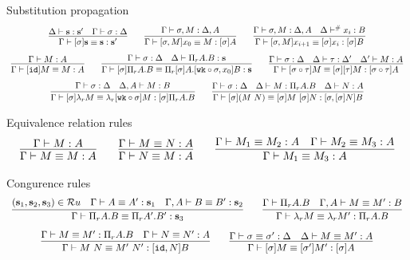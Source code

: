\noindent
Substitution propagation
\[
\begin{array}{c}
\infer{
    \eqexp \Gamma {\tmclo \sigma {\tmcst s}} {\tmcst s} {\tmcst s'}
  }{
    \wfexp \Delta {\tmcst s} {\tmcst s'}
    &
    \wfsub \Gamma \sigma \Delta
  }
  \qquad
  \infer{
    \eqexp \Gamma {\tmclo {\subext \sigma M} {x_0}} M {\tmclo \sigma A}
  }{
    \wfsub \Gamma {\subext \sigma M} {\ctxext \Delta A}
  }
  \qquad
  \infer{
    \eqexp \Gamma {\tmclo {\subext \sigma M} {x_{i+1}}} {\tmclo \sigma x_i} {\tmclo \sigma B}
  }{
    \wfsub \Gamma {\subext \sigma M} {\ctxext \Delta A}
    &
    \ctxlookup \Delta {x_i} B
  }
  \\[8pt]
  \infer{
    \eqexp \Gamma {\tmclo \subid M} M A
  }{
    \wfexp \Gamma M A
  }
  \qquad
  \infer{
    \eqexp \Gamma {\tmclo \sigma {\tppi A B}} {\tppi {\tmclo \sigma A} {\tmclo {\subext {\subclo \subwk \sigma} {x_0}} B}} {\tmcst s}
  }{
    \wfsub \Gamma \sigma \Delta
    &
    \wfexp \Delta {\tppi A B} {\tmcst s}
  }
  \qquad
  \infer{
    \eqexp \Gamma {\tmclo {\subclo \sigma \tau} M} {\tmclo {\sigma} {\tmclo \tau M}} {\tmclo {\subclo \sigma \tau} A}
  }{
    \wfsub \Gamma \sigma \Delta
    &
    \wfsub \Delta \tau {\Delta'}
    &
    \wfexp {\Delta'} M A
  }
  \\[8pt]
  \infer{
    \eqexp \Gamma {\tmclo \sigma {\tmlam M}} {\tmlam {\tmclo {\subclo \subwk \sigma} M}} {\tmclo \sigma {\tppi A B}}
  }{
    \wfsub \Gamma \sigma \Delta
    &
    \wfexp {\ctxext \Delta A} M B
  }
  \qquad
  \infer{
    \eqexp \Gamma {\tmclo \sigma {(\tmapp M N)}} {\tmapp {\tmclo \sigma M} {\tmclo \sigma N}} {\tmclo {\subext \sigma {\tmclo \sigma N}} B}
  }{
    \wfsub \Gamma \sigma \Delta
    &
    \wfexp \Delta M {\tppi A B}
    &
    \wfexp \Delta N A
  }
\end{array}
\]

\noindent
Equivalence relation rules
\[
\begin{array}{c}
  \infer{
    \eqexp \Gamma M M A
  }{
    \wfexp \Gamma M A
  }
  \qquad
  \infer{
    \eqexp \Gamma N M A
  }{
    \eqexp \Gamma M N A
  }
  \qquad
  \infer{
    \eqexp \Gamma {M_1} {M_3} A
  }{
    \eqexp \Gamma {M_1} {M_2} A
    &
    \eqexp \Gamma {M_2} {M_3} A
  }
\end{array}
\]


\noindent
Congurence rules
\[
\begin{array}{c}
  \infer{
    \eqexp \Gamma {\tppi A B} {\tppi {A'} {B'}} {\tmcst s_3}
  }{
    (\tmcst s_1, \tmcst s_2, \tmcst s_3) \in \Ru
    &
    \eqexp \Gamma A {A'} {\tmcst s_1}
    &
    \eqexp {\ctxext \Gamma A} B {B'} {\tmcst s_2}
  }
  \qquad
  \infer{
    \eqexp \Gamma {\tmlam M} {\tmlam {M'}} {\tppi A B}
  }{
    \wftyp \Gamma {\tppi A B}
    &
    \eqexp {\ctxext \Gamma A} M {M'} B
  }
  \\[8pt]
  \infer{
    \eqexp \Gamma {\tmapp M N} {\tmapp {M'} {N'}} {\tmclo {\subext \subid N} B}
  }{
    \eqexp \Gamma M {M'} {\tppi A B}
    &
    \eqexp \Gamma N {N'} A
  }
  \qquad
  \infer{
    \eqexp \Gamma {\tmclo \sigma M} {\tmclo {\sigma'} {M'}} {\tmclo \sigma A}
  }{
    \eqsub \Gamma \sigma {\sigma'} \Delta
    &
    \eqexp \Delta M {M'} A
  }
\end{array}
\]

